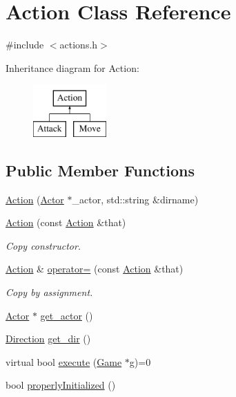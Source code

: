 \hypertarget{class_action}{\section{Action Class Reference}
\label{class_action}
}


{\ttfamily \#include $<$actions.\-h$>$}

Inheritance diagram for Action\-:\begin{figure}[H]
\begin{center}
\leavevmode
\includegraphics[height=2.000000cm]{class_action}
\end{center}
\end{figure}
\subsection*{Public Member Functions}
\begin{DoxyCompactItemize}
\item 
\hyperlink{class_action_a97da8add4b456b38347ad3447e136d48}{Action} (\hyperlink{class_actor}{Actor} $\ast$\-\_\-actor, std\-::string \&dirname)
\item 
\hyperlink{class_action_a4259793a39b4dcfcc1e7f091eae40ced}{Action} (const \hyperlink{class_action}{Action} \&that)
\begin{DoxyCompactList}\small\item\em Copy constructor. \end{DoxyCompactList}\item 
\hyperlink{class_action}{Action} \& \hyperlink{class_action_ade12feba8f8f494fd8bc202d85d07d14}{operator=} (const \hyperlink{class_action}{Action} \&that)
\begin{DoxyCompactList}\small\item\em Copy by assignment. \end{DoxyCompactList}\item 
\hyperlink{class_actor}{Actor} $\ast$ \hyperlink{class_action_a7dd87350cb42eccbf2d096eb4f1f9a85}{get\-\_\-actor} ()
\item 
\hyperlink{class_direction}{Direction} \hyperlink{class_action_a26fff2d0b1eaf0109170fe6d8fe77879}{get\-\_\-dir} ()
\item 
virtual bool \hyperlink{class_action_a18a2520db7750f26d7a571c990b82daf}{execute} (\hyperlink{class_game}{Game} $\ast$g)=0
\item 
bool \hyperlink{class_action_a6d13b602cc90dbd788c61d8cce8acf2c}{properly\-Initialized} ()
\end{DoxyCompactItemize}
